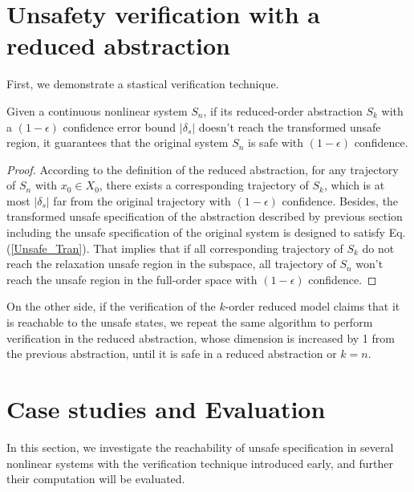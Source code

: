 \documentclass[runningheads,a4paper]{llncs}
\theoremstyle{definition}
\theoremstyle{plain}
\begin{document}
\section{Unsafety verification with a reduced abstraction}  \label{verification process}
First, we demonstrate a stastical verification technique. 
\begin{lemma}
Given a continuous nonlinear system $S_n$, if its reduced-order abstraction $S_k$ with a $(1-\epsilon)$ confidence error bound $|\delta_s|$ doesn't reach the transformed unsafe region, it guarantees that the original system $S_n$ is safe with $(1-\epsilon)$ confidence.
\end{lemma}
 \begin{proof}
According to the definition of the reduced abstraction, for any trajectory of $S_n$ with $x_0 \in X_0$, there exists a corresponding trajectory of $S_k$, which is at most $|\delta_s|$ far from the original trajectory with $(1-\epsilon)$ confidence. Besides, the transformed unsafe specification of the abstraction described by previous section including the unsafe specification of the original system is designed to satisfy Eq.(\ref{Unsafe_Tran}). That implies that if all corresponding trajectory of $S_k$ do not reach the relaxation unsafe region in the subspace, all trajectory of $S_n$ won't reach the unsafe region in the full-order space with $(1-\epsilon)$ confidence.
 \end{proof}
On the other side, if the verification of the $k$-order reduced model claims that it is reachable to the unsafe states, we repeat the same algorithm to perform verification in the reduced abstraction, whose dimension is increased by 1 from the previous abstraction, until it is safe in a reduced abstraction or $k=n$.\\

\section{Case studies and Evaluation} \label{case studies}
In this section, we investigate the reachability of unsafe specification in several nonlinear systems with the verification technique introduced early, and further their computation will be evaluated. \\
\end{document}
